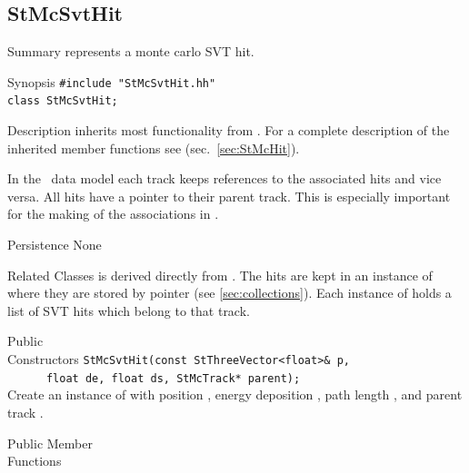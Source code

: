 \subsection{StMcSvtHit}
 
\label{sec:StMcSvtHit}
\begin{Entry}
\item[Summary]
     represents a monte carlo SVT hit.

\item[Synopsis]
    \verb+#include "StMcSvtHit.hh"+\\
    \verb+class StMcSvtHit;+\\

\item[Description]    
     inherits most functionality from .
    For a complete description of the inherited member functions see
     (sec.~\ref{sec:StMcHit}).

    In the \StMcEvent\ data model each track keeps references to the
    associated hits and vice versa. All hits have a pointer to their
    parent track.  This is especially important for the making of the
    associations in \StAssociationMaker. 
    
    
    
\item[Persistence]
    None

\item[Related Classes]
     is derived directly from .
    The hits are kept in an instance of 
    where they are stored by pointer (see \ref{sec:collections}).
    Each instance of  holds a list of SVT hits
    which belong to that track.

\item[Public\\ Constructors]
    \verb+StMcSvtHit(const StThreeVector<float>& p,+\\
    \verb+      float de, float ds, StMcTrack* parent);+\\
    
    Create an instance of  with position ,
    energy deposition , path length , and parent track .

\item[Public Member\\ Functions]


\end{Entry}
